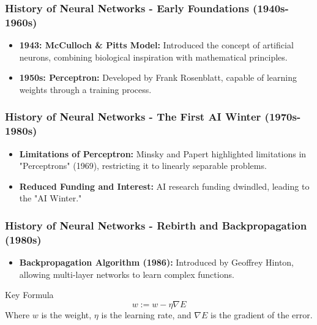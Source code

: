 \documentclass[aspectratio=169]{beamer}
\begin{document}
\begin{frame}[fragile]
    \frametitle{History of Neural Networks - Early Foundations (1940s-1960s)}
    \begin{itemize}
        \item \textbf{1943: McCulloch \& Pitts Model:} Introduced the concept of artificial neurons, combining biological inspiration with mathematical principles.
        \item \textbf{1950s: Perceptron:} Developed by Frank Rosenblatt, capable of learning weights through a training process.
    \end{itemize}
\end{frame}

\begin{frame}[fragile]
    \frametitle{History of Neural Networks - The First AI Winter (1970s-1980s)}
    \begin{itemize}
        \item \textbf{Limitations of Perceptron:} Minsky and Papert highlighted limitations in "Perceptrons" (1969), restricting it to linearly separable problems.
        \item \textbf{Reduced Funding and Interest:} AI research funding dwindled, leading to the "AI Winter."
    \end{itemize}
\end{frame}

\begin{frame}[fragile]
    \frametitle{History of Neural Networks - Rebirth and Backpropagation (1980s)}
    \begin{itemize}
        \item \textbf{Backpropagation Algorithm (1986):} Introduced by Geoffrey Hinton, allowing multi-layer networks to learn complex functions.
    \end{itemize}
    \begin{block}{Key Formula}
        \begin{equation}
        w := w - \eta \nabla E
        \end{equation}
        Where \( w \) is the weight, \( \eta \) is the learning rate, and \( \nabla E \) is the gradient of the error.
    \end{block}
\end{frame}
\end{document}
